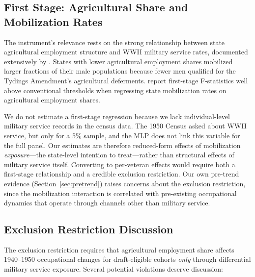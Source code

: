 \documentclass[12pt]{article}
\begin{document}
\subsection{First Stage: Agricultural Share and Mobilization Rates}

The instrument's relevance rests on the strong relationship between state agricultural employment structure and WWII military service rates, documented extensively by \citet{acemoglu2004}. States with lower agricultural employment shares mobilized larger fractions of their male populations because fewer men qualified for the Tydings Amendment's agricultural deferments. \citet{acemoglu2004} report first-stage F-statistics well above conventional thresholds when regressing state mobilization rates on agricultural employment shares.

We do not estimate a first-stage regression because we lack individual-level military service records in the census data. The 1950 Census asked about WWII service, but only for a 5\% sample, and the MLP does not link this variable for the full panel. Our estimates are therefore reduced-form effects of mobilization \textit{exposure}---the state-level intention to treat---rather than structural effects of military service itself. Converting to per-veteran effects would require both a first-stage relationship and a credible exclusion restriction. Our own pre-trend evidence (Section~\ref{sec:pretrend}) raises concerns about the exclusion restriction, since the mobilization interaction is correlated with pre-existing occupational dynamics that operate through channels other than military service.

\subsection{Exclusion Restriction Discussion}

The exclusion restriction requires that agricultural employment share affects 1940--1950 occupational changes for draft-eligible cohorts \textit{only} through differential military service exposure. Several potential violations deserve discussion:
\end{document}
